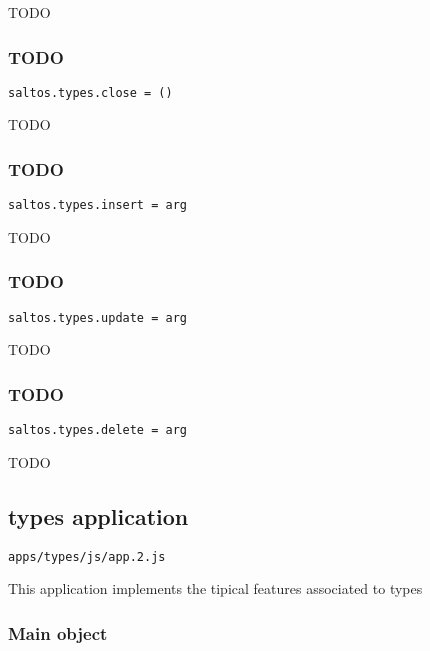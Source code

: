 \documentclass[a4paper]{article}
\begin{document}
TODO

\hypertarget{toc115}{}
\subsubsection{TODO}

\begin{lstlisting}
saltos.types.close = ()
\end{lstlisting}

TODO

\hypertarget{toc116}{}
\subsubsection{TODO}

\begin{lstlisting}
saltos.types.insert = arg
\end{lstlisting}

TODO

\hypertarget{toc117}{}
\subsubsection{TODO}

\begin{lstlisting}
saltos.types.update = arg
\end{lstlisting}

TODO

\hypertarget{toc118}{}
\subsubsection{TODO}

\begin{lstlisting}
saltos.types.delete = arg
\end{lstlisting}

TODO

\hypertarget{toc119}{}
\subsection{types application}

\begin{lstlisting}
apps/types/js/app.2.js
\end{lstlisting}

This application implements the tipical features associated to types

\hypertarget{toc120}{}
\subsubsection{Main object}
\end{document}
